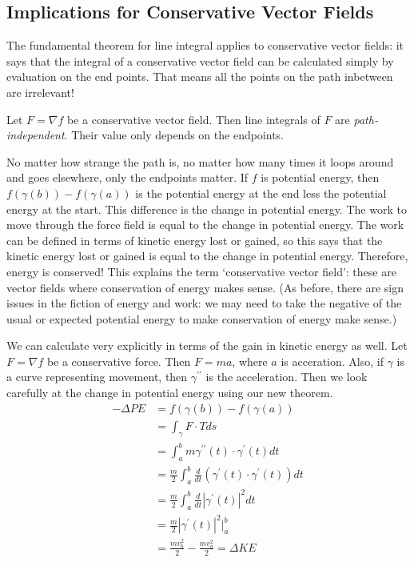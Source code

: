 \documentclass[fleqn,letterpaper]{report}
\begin{document}
\subsection{Implications for Conservative Vector Fields}
\label{implications-conservative}

The fundamental theorem for line integral applies to
conservative vector fields: it says that the integral of a
conservative vector field can be calculated simply by
evaluation on the end points. That means all the points on
the path inbetween are irrelevant!

\begin{prop}
Let $F = \nabla f$ be a conservative vector field. Then line
integrals of $F$ are \emph{path-independent}. Their value
only depends on the endpoints.
\end{prop}

No matter how strange the path is, no matter how
many times it loops around and goes elsewhere, only the
endpoints matter. If
$f$ is potential energy, then $f(\gamma(b)) - f(\gamma(a))$ is
the potential energy at the end less the potential energy
at the start. This difference is the change in potential energy.
The work to move through the force field is equal to the
change in potential energy. The work can be defined in terms
of kinetic energy lost or gained, so this says that the kinetic
energy lost or gained is equal to the change in potential
energy. Therefore, energy is conserved! This explains the
term `conservative vector field': these are vector fields
where conservation of energy makes sense. (As before, there are
sign issues in the fiction of energy and work: we may need to
take the negative of the usual or expected potential energy to
make conservation of energy make sense.)

We can calculate very explicitly in terms of the gain in
kinetic energy as well. Let $F = \nabla f$ be a conservative
force. Then $F = ma$, where $a$ is acceration. Also, if
$\gamma$ is a curve representing movement, then
$\gamma^{\prime \prime}$ is the acceleration. Then we look
carefully at the change in potential energy using our new
theorem.
\begin{align*}
-\Delta PE & = f(\gamma(b)) - f(\gamma(a)) \\
& = \int_{\gamma} F \cdot T ds \\
& = \int_a^b m \gamma^{\prime \prime}(t) \cdot
\gamma^\prime(t) dt \\
& = \frac{m}{2} \int_a^b \frac{d}{dt} (\gamma^\prime(t) \cdot
\gamma^\prime(t)) dt \\
& = \frac{m}{2} \int_a^b \frac{d}{dt} |\gamma^\prime(t)|^2 dt
\\
& = \frac{m}{2} |\gamma^\prime(t)|^2 \bigg|_a^b \\
& = \frac{mv_b^2}{2} - \frac{mv_a^2}{2} = \Delta KE
\end{align*}
\end{document}
